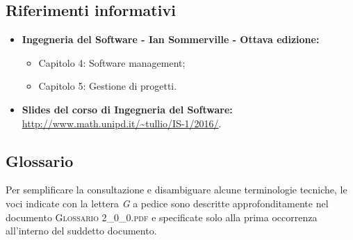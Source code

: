 \subsection{Riferimenti informativi}
\begin{itemize}
\item \textbf{Ingegneria del Software - Ian Sommerville - Ottava edizione:}
	\begin{itemize}
		\item Capitolo 4: Software management;
		\item Capitolo 5: Gestione di progetti.
	\end{itemize}
\item \textbf{Slides del corso di Ingegneria del Software:}\\
\url{http://www.math.unipd.it/~tullio/IS-1/2016/}.
\end{itemize}

\subsection{Glossario}
Per semplificare la consultazione e disambiguare alcune terminologie tecniche, le voci indicate con la lettera \textit{G} a pedice sono descritte approfonditamente nel documento \textsc{Glossario 2\_0\_0.pdf} e specificate solo alla prima occorrenza all'interno del suddetto documento.